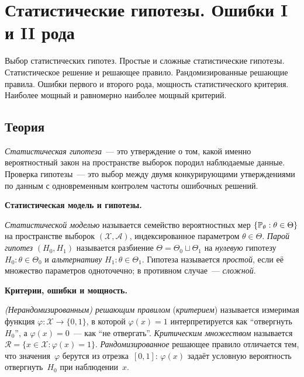 
\section{Статистические гипотезы. Ошибки I и II рода}
\label{sec:1.2.12-hypothesis-testing}

\begin{ticket}
Выбор статистических гипотез. Простые и сложные статистические гипотезы. Статистическое решение и решающее правило. Рандомизированные решающие правила. Ошибки первого и второго рода, мощность статистического критерия. Наиболее мощный и равномерно наиболее мощный критерий.
\end{ticket}

\subsection*{Теория}

\emph{Статистическая гипотеза}~--- это утверждение о том, какой именно вероятностный закон на пространстве выборок породил наблюдаемые данные. Проверка гипотезы~--- это выбор между двумя конкурирующими утверждениями по данным с одновременным контролем частоты ошибочных решений.

\medskip
\noindent\textbf{Статистическая модель и гипотезы.}

\begin{definition}[Гипотеза]
\label{def:hypothesis}
\emph{Статистической моделью} называется семейство вероятностных мер $\{\mathbb{P}_\theta : \theta \in \Theta\}$ на пространстве выборок $(\mathcal{X}, \mathcal{A})$, индексированное параметром $\theta \in \Theta$. \emph{Парой гипотез} $(H_0, H_1)$ называется разбиение $\Theta = \Theta_0 \sqcup \Theta_1$ на \emph{нулевую} гипотезу $H_0 : \theta \in \Theta_0$ и \emph{альтернативу} $H_1 : \theta \in \Theta_1$. Гипотеза называется \emph{простой}, если её множество параметров одноточечно; в противном случае~--- \emph{сложной}.
\end{definition}

\medskip
\noindent\textbf{Критерии, ошибки и мощность.}

\begin{definition}
\label{def:decision-rule}
\emph{(Нерандомизированным) решающим правилом} (\emph{критерием}) называется измеримая функция $\varphi \colon \mathcal{X} \to \{0, 1\}$, в которой $\varphi(x) = 1$ интерпретируется как ``отвергнуть~$H_0$'', а $\varphi(x) = 0$~--- как ``не отвергать''. \emph{Критическим множеством} называется $\mathcal{R} = \{x \in \mathcal{X} : \varphi(x) = 1\}$. \emph{Рандомизированное} решающее правило отличается тем, что значения~$\varphi$ берутся из отрезка~$[0, 1]$: $\varphi(x)$ задаёт условную вероятность отвергнуть~$H_0$ при наблюдении~$x$.
\end{definition}

